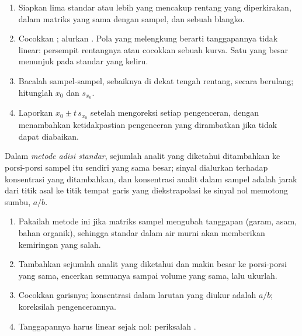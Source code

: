 \begin{method}[Mengalibrasi]\label{met:b2:measurement-statistics:calibrate}
\begin{enumerate}
  \item Siapkan lima standar atau lebih yang mencakup rentang yang
        diperkirakan, dalam matriks yang sama dengan sampel, dan sebuah
        blangko.
  \item Cocokkan ; alurkan . Pola yang
        melengkung berarti tanggapannya tidak linear: persempit rentangnya
        atau cocokkan sebuah kurva. Satu  yang besar menunjuk pada
        standar yang keliru.
  \item Bacalah sampel-sampel, sebaiknya di dekat tengah rentang, secara
        berulang; hitunglah $x_0$ dan
        $s_{x_0}$.
  \item Laporkan $x_0 \pm t\,s_{x_0}$ setelah mengoreksi setiap pengenceran,
        dengan menambahkan ketidakpastian pengenceran yang dirambatkan jika
        tidak dapat diabaikan.
\end{enumerate}
\end{method}

\begin{definition}\label{def:b2:measurement-statistics:standard-addition}
Dalam \emph{metode adisi standar}, sejumlah
analit yang diketahui ditambahkan ke porsi-porsi sampel itu sendiri yang
sama besar; sinyal dialurkan terhadap konsentrasi yang ditambahkan, dan
konsentrasi analit dalam sampel adalah jarak dari titik asal ke titik
tempat garis yang diekstrapolasi ke sinyal nol memotong sumbu, $a/b$.
\end{definition}

\begin{method}\label{met:b2:measurement-statistics:standard-addition}
\begin{enumerate}
  \item Pakailah metode ini jika matriks sampel mengubah tanggapan (garam,
        asam, bahan organik), sehingga standar dalam air murni akan
        memberikan kemiringan yang salah.
  \item Tambahkan sejumlah analit yang diketahui dan makin besar ke
        porsi-porsi yang sama, encerkan semuanya sampai volume yang sama,
        lalu ukurlah.
  \item Cocokkan garisnya; konsentrasi dalam larutan yang diukur adalah
        $a/b$; koreksilah pengencerannya.
  \item Tanggapannya harus linear sejak nol: periksalah .
\end{enumerate}
\end{method}

